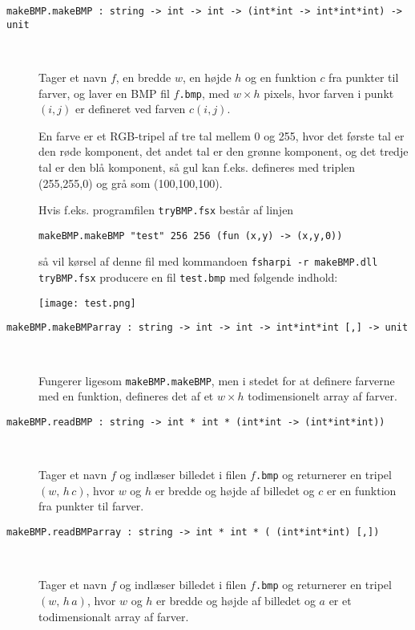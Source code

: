 \documentclass[a4paper]{article}
\begin{document}
\begin{description}
\item[\texttt{makeBMP.makeBMP : string -> int -> int -> (int*int ->
    int*int*int) -> unit}]

~

Tager et navn $f$, en bredde $w$, en højde $h$ og en funktion $c$ fra
punkter til farver, og laver en BMP fil $f$\texttt{.bmp}, med $w×h$
pixels, hvor farven i punkt $(i,j)$ er defineret ved farven $c(i,j)$.

En farve er et RGB-tripel af tre tal mellem 0 og 255, hvor det første
tal er den røde komponent, det andet tal er den grønne komponent, og
det tredje tal er den blå komponent, så gul kan f.eks. defineres med
triplen (255,255,0) og grå som (100,100,100).

Hvis f.eks. programfilen \texttt{tryBMP.fsx} består af linjen

\begin{verbatim}
makeBMP.makeBMP "test" 256 256 (fun (x,y) -> (x,y,0))
\end{verbatim}

\noindent
så vil kørsel af denne fil med kommandoen \texttt{fsharpi -r
  makeBMP.dll tryBMP.fsx} producere en fil \texttt{test.bmp} med
følgende indhold:

\texttt{[image: test.png]}


\item[\texttt{makeBMP.makeBMParray : string -> int -> int ->
    int*int*int [,] -> unit}]

~

Fungerer ligesom \texttt{makeBMP.makeBMP}, men i stedet for at
definere farverne med en funktion, defineres det af et $w×h$
todimensionelt array af farver.


\item[\texttt{makeBMP.readBMP : string -> int * int * (int*int ->
    (int*int*int))}]

~

Tager et navn $f$ og indlæser billedet i filen $f$\texttt{.bmp} og
returnerer en tripel $(w,\,h\,c)$, hvor $w$ og $h$ er bredde og højde
af billedet og $c$ er en funktion fra punkter til farver.

\item[\texttt{makeBMP.readBMParray : string -> int * int * (
    (int*int*int) [,])}]

~

Tager et navn $f$ og indlæser billedet i filen $f$\texttt{.bmp} og
returnerer en tripel $(w,\,h\,a)$, hvor $w$ og $h$ er bredde og højde
af billedet og $a$ er et todimensionalt array af farver.

\end{description}
\end{document}
